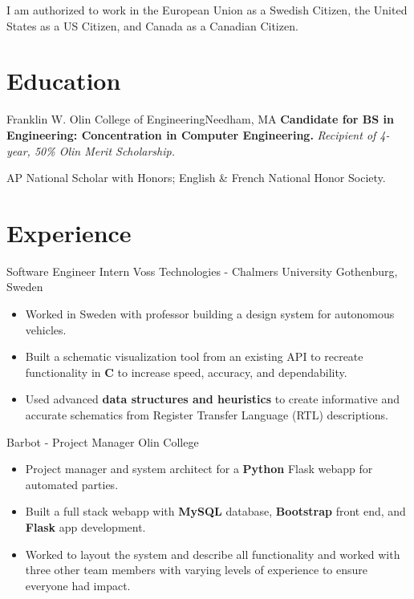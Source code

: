 \documentclass[11 pt]{moderncv}
\begin{document}
\pagebreak
I am authorized to work in the European Union as a Swedish Citizen, the United States as a US Citizen, and Canada as a Canadian Citizen.
\pagebreak

\maketitle

\vspace{-.2in}

\section{Education}

{Franklin W. Olin College of Engineering}{}{Needham, MA}{}
{
	\textbf{Candidate for BS in Engineering: Concentration in Computer Engineering.}
	\newline
	\textit{Recipient of 4-year, 50\% Olin Merit Scholarship.}
}

{
	AP National Scholar with Honors; English \& French National Honor Society.
	\begin{flushright}
	\vspace {-0.3 in}
	\end{flushright}
	\vspace {-0.1 in}
}

\section{Experience}
\vspace{0.1 in}

{Software Engineer Intern}
{Voss Technologies - Chalmers University}
{Gothenburg, Sweden}
{}
{
\begin{itemize}
	\item Worked in Sweden with professor building a design system for autonomous vehicles.
	\item Built a schematic visualization tool from an existing API to recreate functionality in \textbf{C} to increase speed, accuracy, and dependability. 
	\item Used advanced \textbf{data structures and heuristics} to create informative and accurate schematics from Register Transfer Language (RTL) descriptions.
\end{itemize}
}


{Barbot -  Project Manager}
{Olin College}
{}
{}
{
\begin{itemize}
	\item Project manager and system architect for a \textbf{Python} Flask webapp for automated parties. 
	\item Built a full stack webapp with \textbf{MySQL} database, \textbf{Bootstrap} front end, and \textbf{Flask} app development. 
	\item Worked to layout the system and describe all functionality and worked with three other team members with varying levels of experience to ensure everyone had impact. 
\end{itemize}
}
\end{document}
